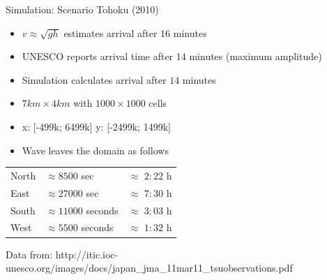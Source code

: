 \documentclass[shortpres]{beamer}
\begin{document}
\begin{frame}{Simulation: Scenario Tohoku (2010)}
		\begin{itemize}
			\item $v \approx \sqrt{gh}$ estimates arrival after $16$ minutes
			\item UNESCO reports arrival time after $14$ minutes (maximum amplitude)
			\item Simulation calculates arrival after $14$ minutes
			\item $7 km \times 4 km$ with $1000 \times 1000$ cells
			\item x: [-499k; 6499k] \hspace{10pt} y: [-2499k; 1499k]
			\item Wave leaves the domain as follows
		\end{itemize}
		\begin{tabular}{lll}
			North & $\approx 8500$ sec & $\approx$ $2:22$ h\\
			East & $\approx 27000$ sec & $\approx$ $7:30$ h\\
			South & $\approx 11000$ seconds & $\approx$ $3:03$ h\\
			West & $\approx 5500$ seconds & $\approx$ $1:32$ h\\
		\end{tabular}
		\vfill
		\flushleft
		{\fontsize{5}{5} \selectfont Data from: http://itic.ioc-unesco.org/images/docs/japan\_jma\_11mar11\_tsuobservations.pdf}	
\end{frame}
\end{document}
